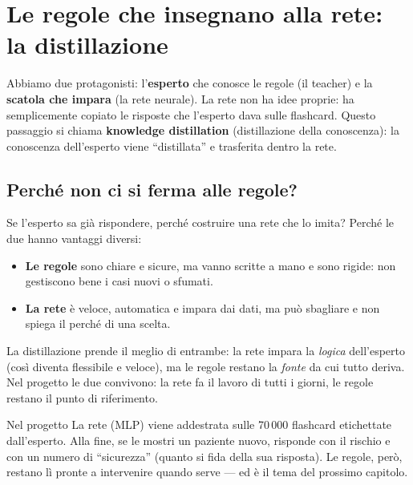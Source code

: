 \chapter{Le regole che insegnano alla rete: la distillazione}\label{cap:p1-distillazione}


Abbiamo due protagonisti: l'\textbf{esperto} che conosce le regole (il teacher)
e la \textbf{scatola che impara} (la rete neurale). La rete non ha idee
proprie: ha semplicemente copiato le risposte che l'esperto dava sulle
flashcard. Questo passaggio si chiama \textbf{knowledge distillation}
(distillazione della conoscenza): la conoscenza dell'esperto viene ``distillata''
e trasferita dentro la rete.

\section{Perché non ci si ferma alle regole?}\label{sec:p1-dist-perche}

Se l'esperto sa già rispondere, perché costruire una rete che lo imita? Perché
le due hanno vantaggi diversi:

\begin{itemize}
  \item \textbf{Le regole} sono chiare e sicure, ma vanno scritte a mano e sono
        rigide: non gestiscono bene i casi nuovi o sfumati.
  \item \textbf{La rete} è veloce, automatica e impara dai dati, ma può
        sbagliare e non spiega il perché di una scelta.
\end{itemize}

La distillazione prende il meglio di entrambe: la rete impara la \emph{logica}
dell'esperto (così diventa flessibile e veloce), ma le regole restano la
\emph{fonte} da cui tutto deriva. Nel progetto le due convivono: la rete fa il
lavoro di tutti i giorni, le regole restano il punto di riferimento.

\begin{esempio}{Nel progetto}
La rete (MLP) viene addestrata sulle 70\,000 flashcard etichettate dall'esperto.
Alla fine, se le mostri un paziente nuovo, risponde con il rischio e con un
numero di ``sicurezza'' (quanto si fida della sua risposta). Le regole, però,
restano lì pronte a intervenire quando serve --- ed è il tema del prossimo
capitolo.
\end{esempio}
